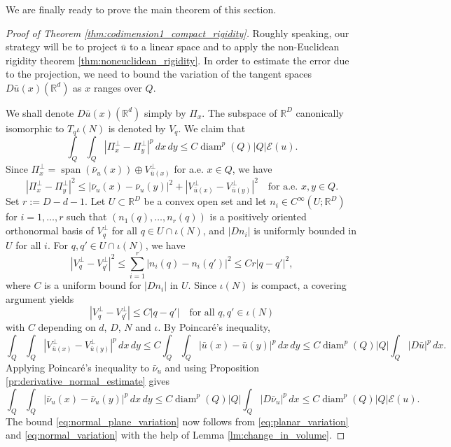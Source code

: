 \documentclass{article}
\numberwithin{equation}{section}
\theoremstyle{definition}
\theoremstyle{remark}
\DeclareMathOperator{\diam}{diam}
\DeclareMathOperator{\lspan}{span}
\begin{document}
We are finally ready to prove the main theorem of this section.

\begin{proof}[Proof of Theorem \ref{thm:codimension1_compact_rigidity}]
    Roughly speaking, our strategy will be to project $\bar{u}$ to a linear space and to apply the non-Euclidean rigidity theorem \ref{thm:noneuclidean_rigidity}. In order to estimate the error due to the projection, we need to bound the variation of the tangent spaces $D\bar{u}(x)(\mathbb{R}^d)$ as $x$ ranges over $Q$.
    
    We shall denote $D\bar{u}(x)(\mathbb{R}^d)$ simply by $\Pi_x$. The subspace of $\mathbb{R}^D$ canonically isomorphic to $T_q\iota(N)$ is denoted by $V_q$. We claim that
    \begin{equation} \label{eq:normal_plane_variation}
        \int_Q \int_Q |\Pi_x^\perp - \Pi_y^\perp|^p \, dx \, dy \le C \diam^p(Q) |Q| \mathcal{E}(u).
    \end{equation}
    Since $\Pi_x^\perp = \lspan(\bar{\nu}_u(x)) \oplus V_{\bar{u}(x)}^\perp$ for a.e. $x \in Q$, we have
    \[
    |\Pi_x^\perp - \Pi_y^\perp|^2 \le |\bar{\nu}_u(x) - \bar{\nu}_u(y)|^2 + |V_{\bar{u}(x)}^\perp - V_{\bar{u}(y)}^\perp|^2 \quad \text{for a.e. } x, y \in Q.
    \]
    Set $r := D - d - 1$. Let $U \subset \mathbb{R}^D$ be a convex open set and let $n_i \in C^\infty(U; \mathbb{R}^D)$ for $i = 1, \dots, r$ such that $(n_1(q), \dots, n_r(q))$ is a positively oriented orthonormal basis of $V_{q}^\perp$ for all $q \in U \cap \iota(N)$, and $|Dn_i|$ is uniformly bounded in $U$ for all $i$. For $q, q' \in U \cap \iota(N)$, we have
    \[
    |V_q^\perp - V_{q'}^\perp|^2 \le \sum_{i = 1}^r |n_i(q) - n_i(q')|^2 \le Cr |q - q'|^2,
    \]
    where $C$ is a uniform bound for $|Dn_i|$ in $U$. Since $\iota(N)$ is compact, a covering argument yields
    \[
    |V_q^\perp - V_{q'}^\perp| \le C |q - q'| \quad \text{for all } q, q' \in \iota(N)
    \]
    with $C$ depending on $d$, $D$, $N$ and $\iota$. By Poincaré's inequality,
    \begin{equation} \label{eq:planar_variation}
        \int_Q \int_Q |V_{\bar{u}(x)}^\perp - V_{\bar{u}(y)}^\perp|^p \, dx \, dy \le C \int_Q \int_Q |\bar{u}(x) - \bar{u}(y)|^p \, dx \, dy \le C \diam^p(Q) |Q| \int_Q |D\bar{u}|^p \, dx.
    \end{equation}
    Applying Poincaré's inequality to $\bar{\nu}_u$ and using Proposition \ref{pr:derivative_normal_estimate} gives
    \begin{equation} \label{eq:normal_variation}
        \int_Q \int_Q |\bar{\nu}_u(x) - \bar{\nu}_u(y)|^p \, dx \, dy \le C \diam^p(Q) |Q| \int_Q |D\bar{\nu}_u|^p \, dx \le C \diam^p(Q) |Q| \mathcal{E}(u).
    \end{equation}
    The bound \eqref{eq:normal_plane_variation} now follows from \eqref{eq:planar_variation} and \eqref{eq:normal_variation} with the help of Lemma \ref{lm:change_in_volume}.


\end{proof}
\end{document}
